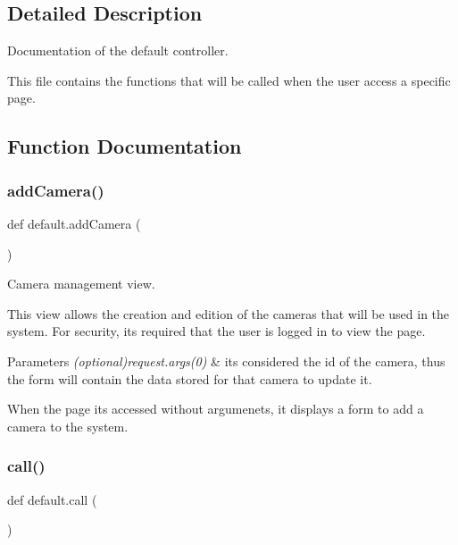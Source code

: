 \subsection{Detailed Description}
Documentation of the default controller. 

This file contains the functions that will be called when the user access a specific page. 

\subsection{Function Documentation}
\mbox{\label{namespacedefault_a407d6142ab401b6d0c0fd242f0547851}} 
\subsubsection{\texorpdfstring{add\+Camera()}{addCamera()}}
{\footnotesize\ttfamily def default.\+add\+Camera (\begin{DoxyParamCaption}{ }\end{DoxyParamCaption})}



Camera management view. 

This view allows the creation and edition of the cameras that will be used in the system. For security, it\textquotesingle{}s required that the user is logged in to view the page.


\begin{DoxyParams}{Parameters}
{\em (optional)request.\+args(0)} & it\textquotesingle{}s considered the id of the camera, thus the form will contain the data stored for that camera to update it.\\
\hline
\end{DoxyParams}
When the page its accessed without argumenets, it displays a form to add a camera to the system. \mbox{\label{namespacedefault_adb399dd3ab3deaaaef6237d72fdb12e9}} 
\subsubsection{\texorpdfstring{call()}{call()}}
{\footnotesize\ttfamily def default.\+call (\begin{DoxyParamCaption}{ }\end{DoxyParamCaption})}



